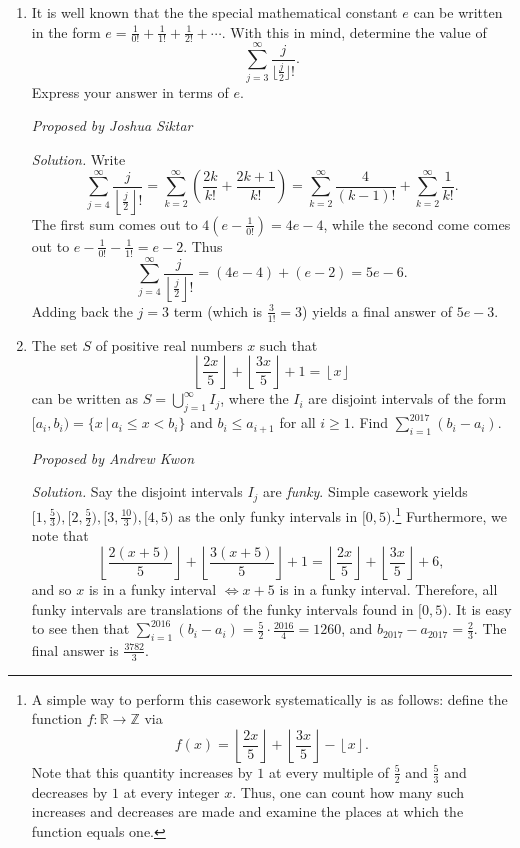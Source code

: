 \documentclass[10pt]{article}
\newcommand{\R}{\mathbb{R}}
\newcommand{\Z}{\mathbb{Z}}
\newcommand{\floor}[1]{\left\lfloor#1\right\rfloor}
\newcommand{\proposed}[1]
{
\vspace{5pt}
\noindent\textit{Proposed by #1}
}
\newcommand{\solution}
{
\vspace{5pt}
\noindent\textit{Solution.}\qquad
}
\begin{document}
\begin{enumerate}
\item It is well known that the the special mathematical constant $e$ can be written in the form $e = \tfrac{1}{0!}+\tfrac{1}{1!}+\tfrac{1}{2!}+\cdots$.  With this in mind, determine the value of \[\sum_{j=3}^\infty\dfrac{j}{\lfloor\frac j2\rfloor!}.\] Express your answer in terms of $e$.

\proposed{Joshua Siktar}

\solution Write \[\sum_{j=4}^\infty\dfrac{j}{\floor{\frac j2}!} = \sum_{k=2}^\infty\left(\dfrac{2k}{k!}+\dfrac{2k+1}{k!}\right) = \sum_{k=2}^\infty\dfrac{4}{(k-1)!}+\sum_{k=2}^\infty\dfrac{1}{k!}.\]  The first sum comes out to $4(e-\tfrac1{0!}) = 4e-4$, while the second come comes out to $e-\tfrac{1}{0!}-\tfrac{1}{1!} = e-2$.  Thus \[\sum_{j=4}^\infty\dfrac{j}{\floor{\frac j2}!} = (4e-4)+(e-2) = 5e-6.\] Adding back the $j=3$ term (which is $\tfrac{3}{1!}=3$) yields a final answer of $\boxed{5e-3}$.

\item The set $S$ of positive real numbers $x$ such that 
	\[
		\floor{\frac{2x}{5}} + \floor{\frac{3x}{5}} + 1 = \floor x
	\]
	can be written as $S = \bigcup_{j = 1}^{\infty} I_{j}$, where the $I_{i}$ are disjoint intervals of the form $[a_{i}, b_{i}) = \{x \, | \, a_i \leq x < b_i\}$ and $b_{i} \leq a_{i+1}$ for all $i \geq 1$. Find $\sum_{i=1}^{2017} (b_{i} - a_{i})$.

\proposed{Andrew Kwon}

\solution Say the disjoint intervals $I_{j}$ are \textit{funky}. Simple casework yields $[1,\tfrac{5}{3}), [2, \tfrac{5}{2}), [3, \tfrac{10}{3}), [4,5)$ as the only funky intervals in $[0,5)$.\footnote{A simple way to perform this casework systematically is as follows: define the function $f:\R\to\Z$ via \[f(x) = \floor{\frac{2x}{5}} + \floor{\frac{3x}{5}} - \floor x.\] Note that this quantity increases by $1$ at every multiple of $\tfrac52$ and $\tfrac53$ and decreases by $1$ at every integer $x$.  Thus, one can count how many such increases and decreases are made and examine the places at which the function equals one.} Furthermore, we note that 
\[
	\floor{\frac{2(x+5)}{5}} + \floor{\frac{3(x+5)}{5}} + 1 = \floor{\frac{2x}{5}} + \floor{\frac{3x}{5}} + 6,
\]
and so $x$ is in a funky interval $\Leftrightarrow x+5$ is in a funky interval. Therefore, all funky intervals are translations of the funky intervals found in $[0,5)$. It is easy to see then that $\sum_{i=1}^{2016} (b_{i} - a_{i}) = \tfrac{5}{2} \cdot \tfrac{2016}{4} = 1260$, and $b_{2017} - a_{2017} = \frac{2}{3}$. The final answer is $\boxed{\tfrac{3782}{3}}$.


\end{enumerate}
\end{document}
